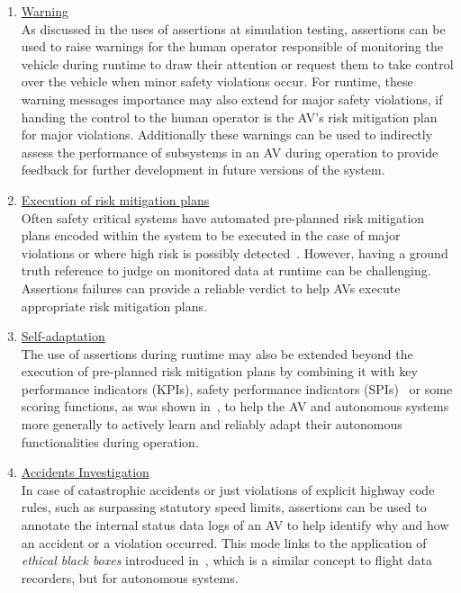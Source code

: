 \begin{enumerate}
    \item \underline{Warning}\\
    As discussed in the uses of assertions at simulation testing, assertions can be used to raise warnings for the human operator responsible of monitoring the vehicle during runtime to draw their attention or request them to take control over the vehicle when minor safety violations occur. 
    For runtime, these warning messages importance may also extend for major safety violations, if handing the control to the human operator is the AV's risk mitigation plan for major violations.
    Additionally these warnings can be used to indirectly assess the performance of subsystems in an AV during operation to provide feedback for further development in future versions of the system.
    
    \item \underline{Execution of risk mitigation plans}\\
    Often safety critical systems have automated pre-planned risk mitigation plans encoded within the system to be executed in the case of major violations or where high risk is possibly detected~\cite{RuntimeReview}.
    However, having a ground truth reference to judge on monitored data at runtime can be challenging. Assertions failures can provide a reliable verdict to help AVs execute appropriate risk mitigation plans.
    
     \item \underline{Self-adaptation}\\
     The use of assertions during runtime may also be extended beyond the execution of pre-planned risk mitigation plans by combining it with key performance indicators (KPIs), safety performance indicators (SPIs)~\cite{Koopman2020} or some scoring functions, as was shown in~\cite{Kang2020}, to help the AV and autonomous systems more generally to actively learn and reliably adapt their autonomous functionalities during operation. 

    \item \underline{Accidents Investigation}\\
    In case of catastrophic accidents or just violations of explicit highway code rules, such as surpassing statutory speed limits, assertions can be used to annotate the internal status data logs of an AV to help identify why and how an accident or a violation occurred.
    This mode links to the application of \textit{ethical black boxes} introduced in~\cite{EthicalBlackBox}, which is a similar concept to flight data recorders, but for autonomous systems.
    
\end{enumerate}

